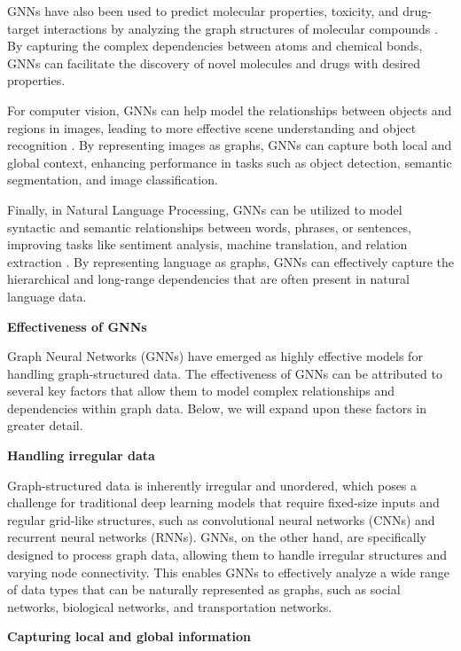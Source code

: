 \documentclass[final]{article}
\begin{document}
GNNs have also been used to predict molecular properties, toxicity, and drug-target interactions by analyzing the graph structures of molecular compounds \cite{gilmer2017}. By capturing the complex dependencies between atoms and chemical bonds, GNNs can facilitate the discovery of novel molecules and drugs with desired properties.

For computer vision, GNNs can help model the relationships between objects and regions in images, leading to more effective scene understanding and object recognition \cite{tang2021}. By representing images as graphs, GNNs can capture both local and global context, enhancing performance in tasks such as object detection, semantic segmentation, and image classification.

Finally, in Natural Language Processing, GNNs can be utilized to model syntactic and semantic relationships between words, phrases, or sentences, improving tasks like sentiment analysis, machine translation, and relation extraction \cite{marcheggiani2017}. By representing language as graphs, GNNs can effectively capture the hierarchical and long-range dependencies that are often present in natural language data.

\item \textbf{Effectiveness of GNNs}

 Graph Neural Networks (GNNs) have emerged as highly effective models for handling graph-structured data. The effectiveness of GNNs can be attributed to several key factors that allow them to model complex relationships and dependencies within graph data. Below, we will expand upon these factors in greater detail.

\item \textbf{Handling irregular data}

Graph-structured data is inherently irregular and unordered, which poses a challenge for traditional deep learning models that require fixed-size inputs and regular grid-like structures, such as convolutional neural networks (CNNs) and recurrent neural networks (RNNs). GNNs, on the other hand, are specifically designed to process graph data, allowing them to handle irregular structures and varying node connectivity. This enables GNNs to effectively analyze a wide range of data types that can be naturally represented as graphs, such as social networks, biological networks, and transportation networks.

\item \textbf{Capturing local and global information}
\end{document}
